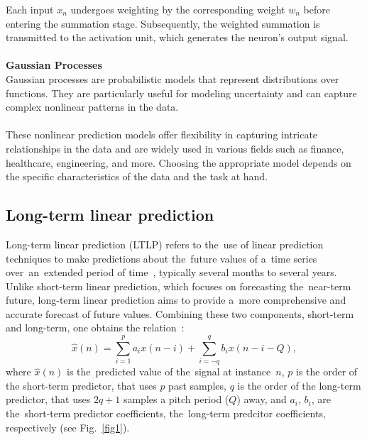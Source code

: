\documentclass[12pt]{report}
\begin{document}
Each input $x_n$ undergoes weighting by the
corresponding weight $w_n$ before entering the summation stage. Subsequently, the weighted
summation is transmitted to the activation unit, which generates the neuron's output signal.\\
\\
\textbf{Gaussian Processes}\\
Gaussian processes are probabilistic models that represent distributions over functions.
They are particularly useful for modeling uncertainty and can capture complex nonlinear
patterns in the data.\\
\\
These nonlinear prediction models offer flexibility in capturing intricate relationships
in the data and are widely used in various fields such as finance, healthcare, engineering,
and more. Choosing the appropriate model depends on the specific characteristics of the
data and the task at hand.\\

\subsection{Long-term linear prediction} \label{ltlp}
\noindent Long-term linear prediction (LTLP) refers to the~use of linear prediction techniques to make
predictions about the~future values of a~time series over~an~extended period of time~\cite{WOS:000266982600001},
typically several months to several years. Unlike short-term linear prediction, which focuses
on forecasting the~near-term future, long-term linear prediction aims to provide a~more
comprehensive and accurate forecast of future values. Combining these two components, short-term and long-term, one obtains the relation~\cite{vaidyanathan2007theory, WOS:A1990DY40800023}:
%
\begin{equation}\label{eq10}
    \hat{x}(n) = \sum_{i=1}^{p} a_i x(n-i) + \sum_{i=-q}^{q} b_i x(n-i-Q),
\end{equation}
%
where $\hat{x}(n)$ is the~predicted value of the~signal at instance~$n$,
$p$ is the order of the short-term predictor, that uses $p$ past samples, $q$
is the order of the long-term predictor, that uses $2q+1$ samples a pitch period ($Q$) away,
and $a_i$, $b_i$, are the~short-term predictor coefficients, the~long-term predcitor coefficients, respectively (see Fig.~\ref{fig1}).
\end{document}
